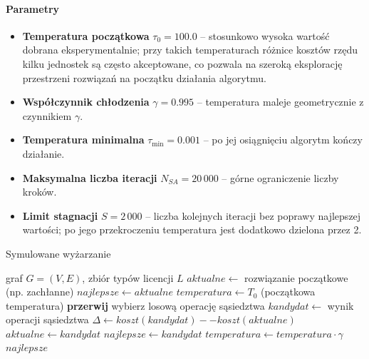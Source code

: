 \paragraph{Parametry}
\begin{itemize}
  \item \textbf{Temperatura początkowa} $\tau_0 = 100.0$ -- stosunkowo wysoka wartość dobrana eksperymentalnie; przy takich temperaturach różnice kosztów rzędu kilku jednostek są często akceptowane, co pozwala na szeroką eksplorację przestrzeni rozwiązań na początku działania algorytmu.
  \item \textbf{Współczynnik chłodzenia} $\gamma = 0.995$ -- temperatura maleje geometrycznie z czynnikiem $\gamma$.
  \item \textbf{Temperatura minimalna} $\tau_{\min} = 0.001$ -- po jej osiągnięciu algorytm kończy działanie.
  \item \textbf{Maksymalna liczba iteracji} $N_{SA} = 20\,000$ -- górne ograniczenie liczby kroków.
  \item \textbf{Limit stagnacji} $S = 2\,000$ -- liczba kolejnych iteracji bez poprawy najlepszej wartości; po jego przekroczeniu temperatura jest dodatkowo dzielona przez 2.
\end{itemize}

\begin{algorithm}[H]
  \caption{Symulowane wyżarzanie}
  \label{alg:sa}
  \begin{algorithmic}[1]
    \Require graf $G=(V,E)$, zbiór typów licencji $L$
    \State $aktualne \gets$ rozwiązanie początkowe (np. zachłanne)
    \State $najlepsze \gets aktualne$
    \State $temperatura \gets T_0$ (początkowa temperatura)
     \textbf{przerwij} \EndIf
    \State wybierz losową operację sąsiedztwa
    \State $kandydat \gets$ wynik operacji sąsiedztwa
    \State $\Delta \gets koszt(kandydat) -- koszt(aktualne)$
    \State $aktualne \gets kandydat$
    \State $najlepsze \gets kandydat$
    \EndIf
    \EndIf
    \State $temperatura \gets temperatura \cdot \gamma$
    \EndFor
    \State \Return $najlepsze$
  \end{algorithmic}
\end{algorithm}

